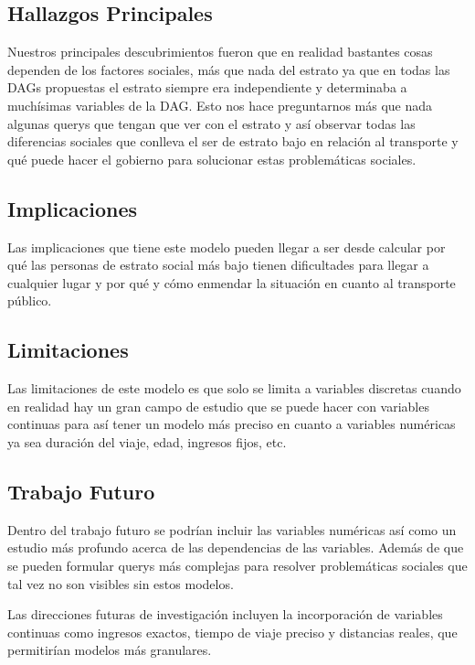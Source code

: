 \documentclass[12pt,a4paper]{article}
\begin{document}
\subsection{Hallazgos Principales}

Nuestros principales descubrimientos fueron que en realidad bastantes cosas dependen de los factores sociales, más que nada del estrato ya que en todas las DAGs propuestas el estrato siempre era independiente y determinaba a muchísimas variables de la DAG. Esto nos hace preguntarnos más que nada algunas querys que tengan que ver con el estrato y así observar todas las diferencias sociales que conlleva el ser de estrato bajo en relación al transporte y qué puede hacer el gobierno para solucionar estas problemáticas sociales.

\subsection{Implicaciones}

Las implicaciones que tiene este modelo pueden llegar a ser desde calcular por qué las personas de estrato social más bajo tienen dificultades para llegar a cualquier lugar y por qué y cómo enmendar la situación en cuanto al transporte público.

\subsection{Limitaciones}

Las limitaciones de este modelo es que solo se limita a variables discretas cuando en realidad hay un gran campo de estudio que se puede hacer con variables continuas para así tener un modelo más preciso en cuanto a variables numéricas ya sea duración del viaje, edad, ingresos fijos, etc.

\subsection{Trabajo Futuro}

Dentro del trabajo futuro se podrían incluir las variables numéricas así como un estudio más profundo acerca de las dependencias de las variables. Además de que se pueden formular querys más complejas para resolver problemáticas sociales que tal vez no son visibles sin estos modelos.

Las direcciones futuras de investigación incluyen la incorporación de variables continuas como ingresos exactos, tiempo de viaje preciso y distancias reales, que permitirían modelos más granulares. 
\end{document}
